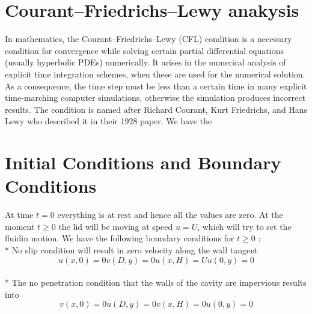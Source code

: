 \documentclass{article}
\begin{document}
\section{Courant–Friedrichs–Lewy anakysis}
In mathematics, the Courant–Friedrichs–Lewy (CFL) condition is a necessary condition for convergence while solving certain partial differential equations (usually hyperbolic PDEs) numerically. It arises in the numerical analysis of explicit time integration schemes, when these are used for the numerical solution. As a consequence, the time step must be less than a certain time in many explicit time-marching computer simulations, otherwise the simulation produces incorrect results. The condition is named after Richard Courant, Kurt Friedrichs, and Hans Lewy who described it in their 1928 paper.
 We have the 

\section{Initial Conditions and Boundary Conditions}

At time $t=0$ everything is at rest and hence all the values are zero. At the moment $t \geq0$ the lid will be moving at speed $u=U$, which will try to set the fluidin motion. We have the following boundary conditions for $t\geq0$ :
\\*
No slip condition will result in zero velocity along the wall tangent
\begin{subequations}
\begin{equation}
u(x,0)=0
\end{equation}
\begin{equation}
v(D,y)=0
\end{equation}
\begin{equation}
u(x,H)=U
\end{equation}
\begin{equation}
u(0,y)=0
\end{equation}
\end{subequations}
\\*
The no penetration condition that the walls of the cavity are impervious results into
\begin{subequations}
\begin{equation}
v(x,0)=0
\end{equation}
\begin{equation}
u(D,y)=0
\end{equation}
\begin{equation}
v(x,H)=0
\end{equation}
\begin{equation}
u(0,y)=0
\end{equation}
\end{subequations}
\end{document}

